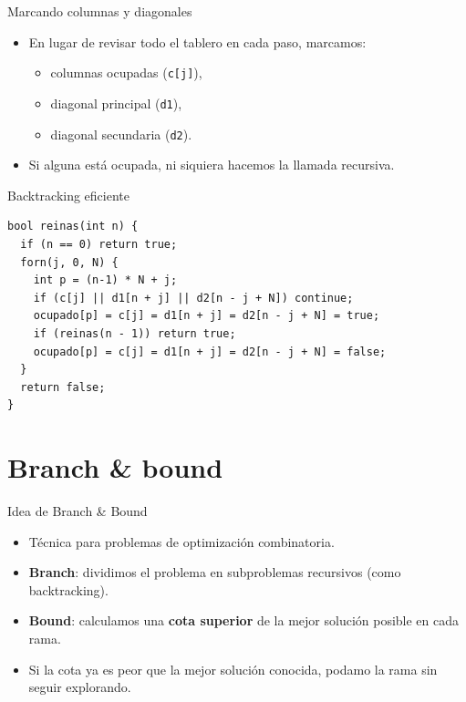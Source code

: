 \documentclass[aspectratio=169]{beamer}
\begin{document}
\begin{frame}[fragile]{Marcando columnas y diagonales}
  \begin{itemize}
    \item En lugar de revisar todo el tablero en cada paso, marcamos:
      \begin{itemize}
        \item columnas ocupadas (\texttt{c[j]}),
        \item diagonal principal (\texttt{d1}),
        \item diagonal secundaria (\texttt{d2}).
      \end{itemize}
    \item Si alguna está ocupada, ni siquiera hacemos la llamada recursiva.
  \end{itemize}
  \begin{block}{Backtracking eficiente}
  \begin{lstlisting}[style=customc]
bool reinas(int n) {
  if (n == 0) return true;
  forn(j, 0, N) {
    int p = (n-1) * N + j;
    if (c[j] || d1[n + j] || d2[n - j + N]) continue;
    ocupado[p] = c[j] = d1[n + j] = d2[n - j + N] = true;
    if (reinas(n - 1)) return true;
    ocupado[p] = c[j] = d1[n + j] = d2[n - j + N] = false;
  }
  return false;
}\end{lstlisting}
  \end{block}
\end{frame}

\section{Branch \& bound}

\begin{frame}{Idea de Branch \& Bound}
  \begin{itemize}
    \item Técnica para problemas de optimización combinatoria.
    \item \textbf{Branch}: dividimos el problema en subproblemas recursivos (como backtracking).
    \item \textbf{Bound}: calculamos una \textbf{cota superior} de la mejor solución posible en cada rama.
    \item Si la cota ya es peor que la mejor solución conocida, podamo la rama sin seguir explorando.
  \end{itemize}
\end{frame}
\end{document}
